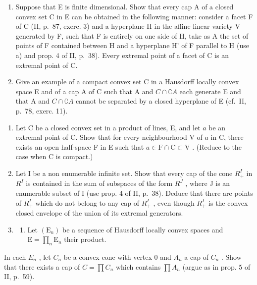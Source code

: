 \begin{enumerate}
\def\labelenumi{\alph{enumi})}
\setcounter{enumi}{1}
\item
  Suppose that E is finite dimensional. Show that every cap A of a closed convex set C in E can be obtained in the following manner: consider a facet F of C (II, p.~87, exerc. 3) and a hyperplane H in the affine linear variety V generated by F, such that F is entirely on one side of H, take as A the set of points of F contained between H and a hyperplane H' of F parallel to H (use a) and prop. 4 of II, p.~38). Every extremal point of a facet of C is an extremal point of C.
\item
  Give an example of a compact convex set C in a Hausdorff locally convex space E and of a cap A of C such that A and \(C \cap \complement A\) each generate E and that A and \(C \cap \complement A\) cannot be separated by a closed hyperplane of E (cf.~II, p.~78, exerc. 11).
\end{enumerate}

\begin{enumerate}
\def\labelenumi{\arabic{enumi})}
\setcounter{enumi}{26}
\item
  Let C be a closed convex set in a product of lines, E, and let \(a\) be an extremal point of C. Show that for every neighbourhood V of \(a\) in C, there exists an open half-space F in E such that \(a \in \mathrm{F} \cap \mathrm{C} \subset \mathrm{V}\) . (Reduce to the case when C is compact.)
\item
  Let I be a non enumerable infinite set. Show that every cap of the cone \(R_{+}^{I}\) in \(R^{I}\) is contained in the sum of subspaces of the form \(R^{J}\) , where J is an enumerable subset of I (use prop. 4 of II, p.~38). Deduce that there are points of \(R_{+}^{I}\) which do not belong to any cap of \(R_{+}^{I}\) , even though \(R_{+}^{I}\) is the convex closed envelope of the union of its extremal generators.
\item
  \begin{enumerate}
  \def\labelenumii{\alph{enumii})}
  \tightlist
  \item
    Let \((\mathrm{E}_n)\) be a sequence of Hausdorff locally convex spaces and \(\mathrm{E} = \prod_{n}\mathrm{E}_{n}\) their product.
  \end{enumerate}
\end{enumerate}

In each \(E_{n}\) , let \(C_{n}\) be a convex cone with vertex 0 and \(A_{n}\) a cap of \(C_{n}\) . Show that there exists a cap of \(C = \prod C_{n}\) which contains \(\prod A_{n}\) (argue as in prop. 5 of II, p.~59).

